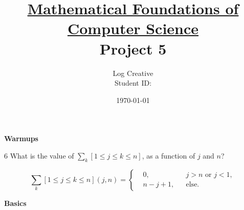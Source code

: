 \documentclass[a4paper,12pt]{article}
\title{\small \underline{Mathematical Foundations of Computer Science}\\\Large Project 5}
\author{Log Creative\\\small Student ID: }
\date{\today}
\makeatletter
\newtheorem*{solution}{Solution}
\theoremstyle{definition}
\renewenvironment{solution}[1][Solution] {\par\pushQED{\qed}\normalfont\topsep6\p@\@plus6\p@\relax\trivlist\item[\hskip\labelsep\bfseries#1\@addpunct{.}]\ignorespaces}{\popQED\endtrivlist\@endpefalse} \makeatother
\newenvironment{problems}{\begin{list}{}{\renewcommand{\makelabel}[1]{\textbf{##1}\hfil}}}{\end{list}}
\makeatother
\begin{document}
\maketitle

\noindent\textbf{Warmups}

\begin{problems}

    \item[6] What is the value of $\sum_k [1\leq j \leq k \leq n]$, as a function of $j$ and $n$? 
    \begin{solution}
        \begin{equation*}
        \sum_k [1\leq j \leq k \leq n](j,n) = \left\{\begin{aligned}
            &0, &&j>n\text{ or }j<1,\\
            &n-j+1, &&\text{else.}
        \end{aligned}\right.
        \end{equation*}
    \end{solution}
    
\end{problems}

\noindent\textbf{Basics}
\end{document}

